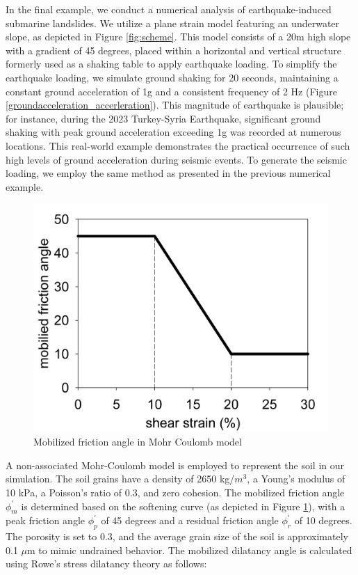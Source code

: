 \documentclass[preprint,12pt]{elsarticle}
\begin{document}
In the final example, we conduct a numerical analysis of earthquake-induced submarine landslides. We utilize a plane strain model featuring an underwater slope, as depicted in Figure \ref{fig:scheme}. This model consists of a 20m high slope with a gradient of 45 degrees, placed within a horizontal and vertical structure formerly used as a shaking table to apply earthquake loading. To simplify the earthquake loading, we simulate ground shaking for 20 seconds, maintaining a constant ground acceleration of 1g and a consistent frequency of 2 Hz (Figure \ref{groundacceleration_accerleration}). This magnitude of earthquake is plausible; for instance, during the 2023 Turkey-Syria Earthquake, significant ground shaking with peak ground acceleration exceeding 1g was recorded at numerous locations. This real-world example demonstrates the practical occurrence of such high levels of ground acceleration during seismic events. To generate the seismic loading, we employ the same method as presented in the previous numerical example.
%
%
\begin{figure}[H]
\center
\includegraphics[scale=0.25]{model.jpg}
\caption{Mobilized friction angle in Mohr Coulomb model}
\label{fig:model}
\end {figure}
%
%
A non-associated Mohr-Coulomb model is employed to represent the soil in our simulation. The soil grains have a density of 2650 kg/$m^3$, a Young's modulus of 10 kPa, a Poisson's ratio of 0.3, and zero cohesion. The mobilized friction angle $\phi^\prime_m$ is determined based on the softening curve (as depicted in Figure \ref{fig:model}), with a peak friction angle $\phi^\prime_p$ of 45 degrees and a residual friction angle $\phi^\prime_r$ of 10 degrees. The porosity is set to 0.3, and the average grain size of the soil is approximately 0.1 $\mu$m to mimic undrained behavior. The mobilized dilatancy angle is calculated using Rowe's stress dilatancy theory \cite{Wood} as follows:
\end{document}
